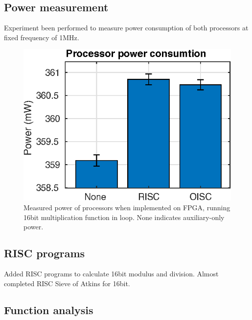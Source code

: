 \documentclass[a4paper,12pt]{article}
\begin{document}
\subsection{Power measurement}
Experiment been performed to measure power consumption of both processors at fixed frequency of 1MHz.

\begin{figure}[h!]
	\centering
	\includegraphics[]{../tests/power.eps}
	\caption{Measured power of processors when implemented on FPGA, running 16bit multiplication function in loop. None indicates auxiliary-only power.}
	\label{fig:power}
\end{figure}

\subsection{RISC programs}
Added RISC programs to calculate 16bit modulus and division.
Almost completed RISC Sieve of Atkins for 16bit.

\subsection{Function analysis}
\end{document}
